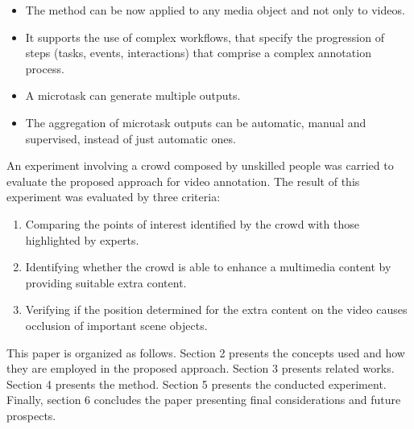 \begin{itemize}
\item The method can be now applied to any media object and not only to videos.
\item It supports the use of complex workflows, that specify the progression of steps (tasks, events, interactions) that comprise a complex annotation process.
\item A microtask can generate multiple outputs.
\item The aggregation of microtask outputs can be automatic, manual and supervised, instead of just automatic ones.
\end{itemize}

An experiment involving a crowd composed by unskilled people  was carried to evaluate the proposed approach for video annotation. The result of this experiment was evaluated by three criteria:

\begin{enumerate}
\item Comparing the points of interest identified by the crowd with those highlighted by experts.
\item Identifying whether the crowd is able to enhance a multimedia content by providing suitable extra content. 
\item Verifying if the position determined for the extra content on the video causes occlusion of important scene objects.
\end{enumerate}






This paper is organized as follows. Section 2 presents the concepts used and how they are employed in the proposed approach. Section 3 presents related works. Section 4 presents the method. Section 5 presents the conducted experiment. Finally, section 6 concludes the paper presenting final considerations and future prospects.